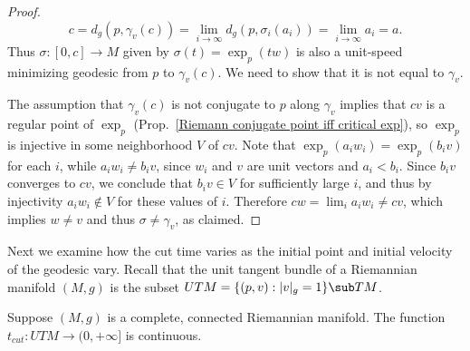 \begin{proof}
\[c=d_g(p,\gamma_v(c))=\lim_{i\to\infty}d_g(p,\sigma_i(a_i))=\lim_{i\to\infty}a_i=a.\]
Thus $\sigma:[0,c]\to M$ given by $\sigma(t)=\exp_p(tw)$ is also a unit-speed minimizing geodesic from $p$ to $\gamma_v(c)$. We need to show that it is not equal to $\gamma_v$.\par
The assumption that $\gamma_v(c)$ is not conjugate to $p$ along $\gamma_v$ implies that $cv$ is a regular point of $\exp_p$ (Prop.~\ref{Riemann conjugate point iff critical exp}), 
so $\exp_p$ is injective in some neighborhood $V$ of $cv$. Note that $\exp_p(a_iw_i)=\exp_p(b_iv)$ for each $i$, while $a_iw_i\neq b_iv$, since $w_i$ and $v$ are unit 
vectors and $a_i<b_i$. Since $b_iv$ converges to $cv$, we conclude that $b_iv\in V$ for sufficiently large $i$, and thus by injectivity $a_iw_i\notin V$ for these values 
of $i$. Therefore $cw=\lim_ia_iw_i\neq cv$, which implies $w\neq v$ and thus $\sigma\neq\gamma_v$, as claimed.
\end{proof}
Next we examine how the cut time varies as the initial point and initial velocity of the geodesic vary. Recall that the unit tangent bundle of a Riemannian manifold $(M,g)$ 
is the subset $UTM=\{(p,v):|v|_g=1\}\sub TM$.
\begin{theorem}\label{Riemann t_cut continuous}
Suppose $(M,g)$ is a complete, connected Riemannian manifold. The function $t_{cut}:UTM\to(0,+\infty]$ is continuous.
\end{theorem}
